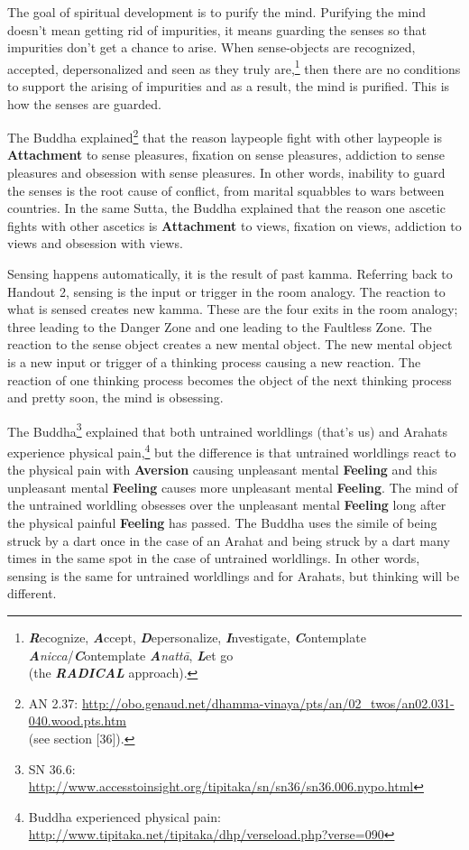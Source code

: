 The goal of spiritual development is to purify the mind. Purifying the mind doesn’t mean getting rid of impurities, it means guarding the senses so that impurities don’t get a chance to arise. When sense-objects are recognized, accepted, depersonalized and seen as they truly are,\footnote{\textit{\textbf{R}}ecognize, \textbf{\textit{A}}ccept, \textit{\textbf{D}}epersonalize, \textbf{\textit{I}}nvestigate, \textit{\textbf{C}}ontemplate \textbf{\textit{A}}\textit{nicca}/\textit{\textbf{C}}ontemplate \textbf{\textit{A}}\textit{nattā}, \textbf{\textit{L}}et go \\(the \textit{\textbf{RADICAL}} approach).} then there are no conditions to support the arising of impurities and as a result, the mind is purified. This is how the senses are guarded.

The Buddha explained\footnote{AN 2.37: \url{http://obo.genaud.net/dhamma-vinaya/pts/an/02_twos/an02.031-040.wood.pts.htm}\\(see section [36]).} that the reason laypeople fight with other laypeople is \textbf{Attachment} to sense pleasures, fixation on sense pleasures, addiction to sense pleasures and obsession with sense pleasures. In other words, inability to guard the senses is the root cause of conflict, from marital squabbles to wars between countries. In the same Sutta, the Buddha explained that the reason one ascetic fights with other ascetics is \textbf{Attachment} to views, fixation on views, addiction to views and obsession with views.

Sensing happens automatically, it is the result of past kamma. Referring back to Handout 2, sensing is the input or trigger in the room analogy. The reaction to what is sensed creates new kamma. These are the four exits in the room analogy; three leading to the Danger Zone and one leading to the Faultless Zone. The reaction to the sense object creates a new mental object. The new mental object is a new input or trigger of a thinking process causing a new reaction. The reaction of one thinking process becomes the object of the next thinking process and pretty soon, the mind is obsessing.

The Buddha\footnote{SN 36.6: \url{http://www.accesstoinsight.org/tipitaka/sn/sn36/sn36.006.nypo.html}} explained that both untrained worldlings (that’s us) and Arahats experience physical pain,\footnote{Buddha experienced physical pain: \url{http://www.tipitaka.net/tipitaka/dhp/verseload.php?verse=090}} but the difference is that untrained worldlings react to the physical pain with \textbf{Aversion} causing unpleasant mental \textbf{Feeling} and this unpleasant mental \textbf{Feeling} causes more unpleasant mental \textbf{Feeling}. The mind of the untrained worldling obsesses over the unpleasant mental \textbf{Feeling} long after the physical painful \textbf{Feeling} has passed. The Buddha uses the simile of being struck by a dart once in the case of an Arahat and being struck by a dart many times in the same spot in the case of untrained worldlings. In other words, sensing is the same for untrained worldlings and for Arahats, but thinking will be different.


